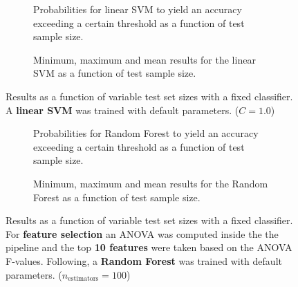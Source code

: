 \begin{figure}
    \captionsetup[subfigure]{justification=justified,singlelinecheck=false}
    \begin{subfigure}[t]{0.61\textwidth}
        
        \caption{Probabilities for linear SVM to yield an accuracy exceeding a certain threshold as a function of test sample size.}
    \end{subfigure}
    \hspace{3.0mm}
    \begin{subfigure}[t]{0.34\textwidth}
        
        \caption{Minimum, maximum and mean results for the linear SVM as a function of test sample size.}
    \end{subfigure}
    \caption[Effects of varying test sample size. Linear SVM; No preprocessing]{Results as a function of variable test set sizes with a fixed classifier. A \textbf{{linear SVM}} was trained with default parameters. ($C=\num{1.0}$)}
    \label{fig:no_PCA_no_selection_LinearSVC}
\end{figure}

\begin{figure}
    \captionsetup[subfigure]{justification=justified,singlelinecheck=false}
    \begin{subfigure}[t]{0.61\textwidth}
        
        \caption{Probabilities for Random Forest to yield an accuracy exceeding a certain threshold as a function of test sample size.}
    \end{subfigure}
    \hspace{3.0mm}
    \begin{subfigure}[t]{0.34\textwidth}
        
        \caption{Minimum, maximum and mean results for the Random Forest as a function of test sample size.}
    \end{subfigure}
    \caption[Effects of varying test sample size. Random Forest; Preprocessing: ANOVA feature selection ($k_\text{best} = \num{10}$)]{Results as a function of variable test set sizes with a fixed classifier. For \textbf{feature selection} an ANOVA was computed inside the the pipeline and the top \textbf{10 features} were taken based on the ANOVA F-values. Following, a \textbf{{Random Forest}} was trained with default parameters. ($n_\text{estimators}=\num{100}$)}
    \label{fig:no_PCA_10_best_selected_RandomForest}
\end{figure}

